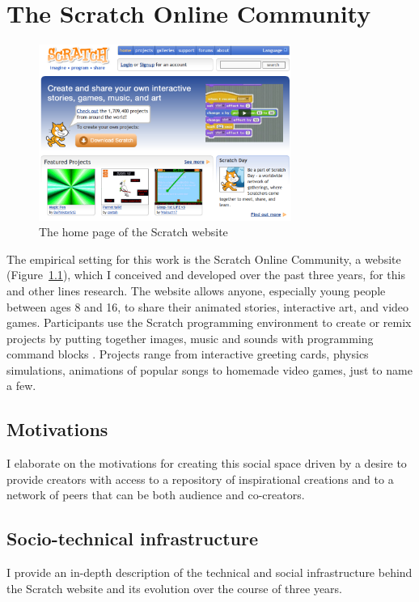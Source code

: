 \chapter{The Scratch Online Community}

\begin{figure}
\centering
\includegraphics[width=3.25in]{figures/websitehomepage.png}
\caption{The home page of the Scratch website}
\label{fig:websitehomepage}
\end{figure}

The empirical setting for this work is the Scratch Online Community, a website (Figure~\ref{fig:websitehomepage}), which I conceived and developed over the past three years, for this and other lines research.
The website allows anyone, especially young people between ages 8 and 16, to share their animated stories, interactive art, and video games. Participants use the Scratch programming environment to create or remix projects by putting together images, music and sounds with programming command blocks \citep{resnick_scratch:_2009}.
Projects range from interactive greeting cards, physics simulations, animations of popular songs to homemade video games, just to name a few.  

\section{Motivations}

I elaborate on the motivations for creating this social space driven by a desire to provide creators with access to a repository of inspirational creations and to a network of peers that can be both audience and co-creators.


\section{Socio-technical infrastructure}
I provide an in-depth description of the technical and social infrastructure behind the Scratch website and its evolution over the course of three years.  

